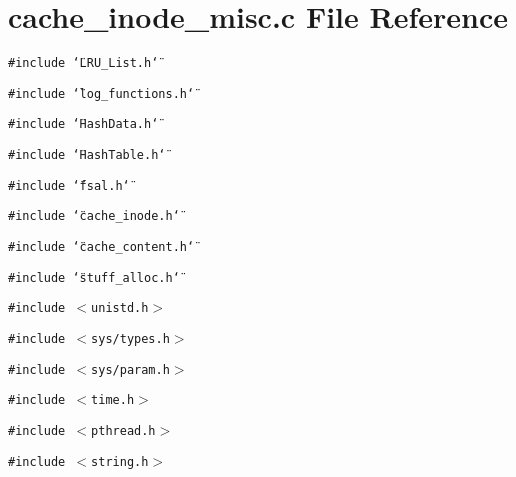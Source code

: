 \section{cache\_\-inode\_\-misc.c File Reference}
\label{cache__inode__misc_8c}
{\tt \#include \char`\"{}LRU\_\-List.h\char`\"{}}\par
{\tt \#include \char`\"{}log\_\-functions.h\char`\"{}}\par
{\tt \#include \char`\"{}HashData.h\char`\"{}}\par
{\tt \#include \char`\"{}HashTable.h\char`\"{}}\par
{\tt \#include \char`\"{}fsal.h\char`\"{}}\par
{\tt \#include \char`\"{}cache\_\-inode.h\char`\"{}}\par
{\tt \#include \char`\"{}cache\_\-content.h\char`\"{}}\par
{\tt \#include \char`\"{}stuff\_\-alloc.h\char`\"{}}\par
{\tt \#include $<$unistd.h$>$}\par
{\tt \#include $<$sys/types.h$>$}\par
{\tt \#include $<$sys/param.h$>$}\par
{\tt \#include $<$time.h$>$}\par
{\tt \#include $<$pthread.h$>$}\par
{\tt \#include $<$string.h$>$}\par
